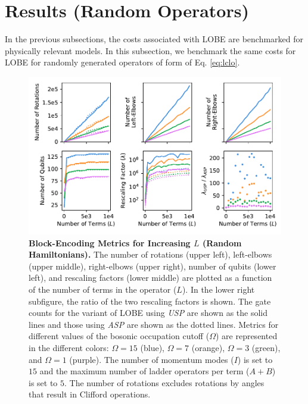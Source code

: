 \section{Results (Random Operators)}
\label{sec:random-op-results}

In the previous subsections, the costs associated with LOBE are benchmarked for physically relevant models.
In this subsection, we benchmark the same costs for LOBE for randomly generated operators of form of Eq. \ref{eq:lclo}.

\begin{figure}
    \centering
    \includegraphics[width=16cm]{figures/random_hamiltonians_metrics_vs_terms.pdf}
    \caption{
        \textbf{Block-Encoding Metrics for Increasing $L$ (Random Hamiltonians).}
        The number of rotations (upper left), left-elbows (upper middle), right-elbows (upper right), number of qubits (lower left), and rescaling factors (lower middle) are plotted as a function of the number of terms in the operator ($L$).
        In the lower right subfigure, the ratio of the two rescaling factors is shown.
        The gate counts for the variant of LOBE using \textit{USP} are shown as the solid lines and those using \textit{ASP} are shown as the dotted lines.
        Metrics for different values of the bosonic occupation cutoff ($\Omega$) are represented in the different colors: $\Omega = 15$ (blue), $\Omega = 7$ (orange), $\Omega = 3$ (green), and $\Omega = 1$ (purple).
        The number of momentum modes ($I$) is set to $15$ and the maximum number of ladder operators per term ($A + B$) is set to $5$.
        The number of rotations excludes rotations by angles that result in Clifford operations.
    }
    \label{fig:random_hamiltonians_metrics_vs_terms}
\end{figure}

